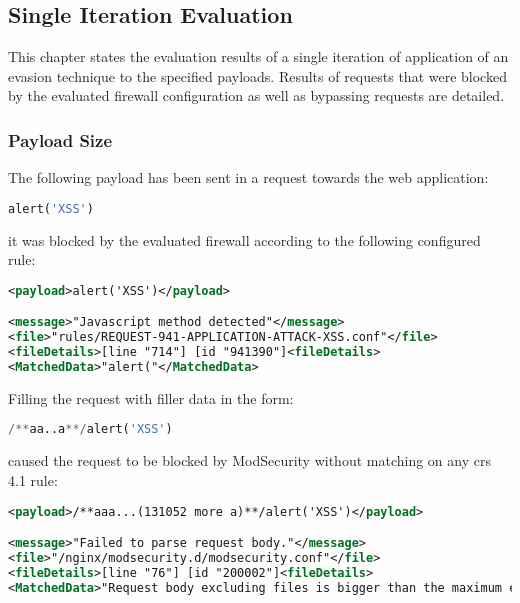\subsection{Single Iteration Evaluation}
\label{sec:singleiterationeva}
This chapter states the evaluation results of a single iteration of application of an evasion technique to the specified payloads. Results of requests that were blocked by the evaluated firewall configuration as well as bypassing requests are detailed.

\subsubsection{Payload Size}
\label{sec:paylensingleiter}
The following payload has been sent in a request towards the web application:

\begin{lstlisting}[style=basicStyle, language=Python]
alert('XSS')
\end{lstlisting}

it was blocked by the evaluated firewall according to the following configured rule:

\begin{lstlisting}[style=ruleStyle, language=XML, caption=alert('XSS') blocked, label={lst:alertXSSblocked}]
<payload>alert('XSS')</payload>

<message>"Javascript method detected"</message>
<file>"rules/REQUEST-941-APPLICATION-ATTACK-XSS.conf"</file>
<fileDetails>[line "714"] [id "941390"]<fileDetails>
<MatchedData>"alert("</MatchedData>
\end{lstlisting}

Filling the request with filler data in the form: 

\begin{lstlisting}[style=basicStyle, language=Python]
/**aa..a**/alert('XSS')
\end{lstlisting}

caused the request to be blocked by ModSecurity without matching on any \acrshort{crs} 4.1 rule:

\begin{lstlisting}[style=ruleStyle, language=XML, caption=Request with body bigger than expected blocked, label={lst:requesttoobig}]
<payload>/**aaa...(131052 more a)**/alert('XSS')</payload>

<message>"Failed to parse request body."</message>
<file>"/nginx/modsecurity.d/modsecurity.conf"</file>
<fileDetails>[line "76"] [id "200002"]<fileDetails>
<MatchedData>"Request body excluding files is bigger than the maximum expected."</MatchedData>
\end{lstlisting}

